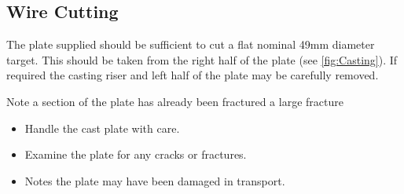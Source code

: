 \subsection{Wire Cutting}
The plate supplied should be sufficient to cut a flat nominal 49mm diameter target. This should be taken from the right half of the plate (see \ref{fig:Casting}). If required the casting riser and left half of the plate may be carefully removed.

Note a section of the plate has already been fractured a large fracture 
\begin{itemize}
\item Handle the cast plate with care. 
\item Examine the plate for any cracks or fractures. 
\item Notes the plate may have been damaged in transport. 
\end{itemize}